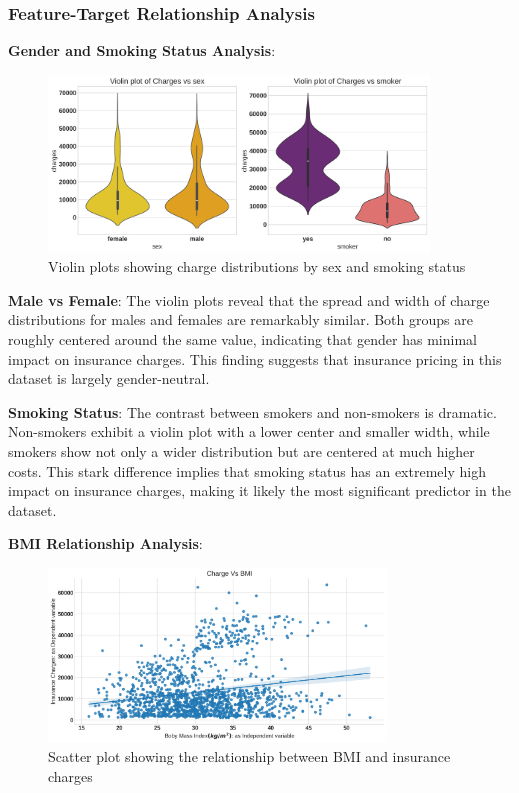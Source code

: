 \documentclass[12pt,a4paper]{article}
\begin{document}
\newpage

\subsubsection{Feature-Target Relationship Analysis}

\textbf{Gender and Smoking Status Analysis}:

\begin{figure}[H]
\centering
\includegraphics[width=0.9\textwidth]{violin_plots_sex_smoker.png}
\caption{Violin plots showing charge distributions by sex and smoking status}
\label{fig:violin_plots_sex_smoker}
\end{figure}

\textbf{Male vs Female}: The violin plots reveal that the spread and width of charge distributions for males and females are remarkably similar. Both groups are roughly centered around the same value, indicating that gender has minimal impact on insurance charges. This finding suggests that insurance pricing in this dataset is largely gender-neutral.

\textbf{Smoking Status}: The contrast between smokers and non-smokers is dramatic. Non-smokers exhibit a violin plot with a lower center and smaller width, while smokers show not only a wider distribution but are centered at much higher costs. This stark difference implies that smoking status has an extremely high impact on insurance charges, making it likely the most significant predictor in the dataset.

\textbf{BMI Relationship Analysis}:

\begin{figure}[H]
\centering
\includegraphics[width=0.8\textwidth]{charges_vs_bmi.png}
\caption{Scatter plot showing the relationship between BMI and insurance charges}
\label{fig:charges_vs_bmi}
\end{figure}
\end{document}

